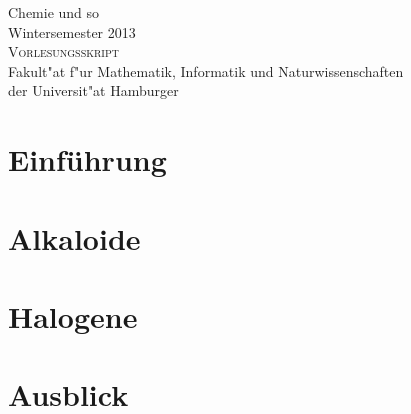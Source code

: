 \documentclass{scrbook}
\begin{document}
\begin{titlepage}
	\begin{center}
		\vspace*{5em}
		{\huge Chemie und so}\\[1.5em]
		{\Large Wintersemester 2013}\\[4em]	
		{\large \textsc{Vorlesungsskript}}\\[4em]
		{\large Fakult"at f"ur Mathematik, Informatik und Naturwissenschaften \\
		der Universit"at Hamburger}\\[1.5em]
	\end{center}
\end{titlepage}

\chapter{Einführung}


\chapter{Alkaloide}


\chapter{Halogene}


\chapter{Ausblick}

\end{document}
